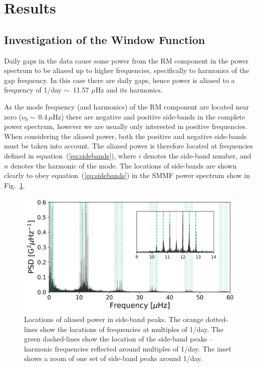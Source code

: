 \section{Results}\label{sec:SMMF_reults}

\subsection{Investigation of the Window Function}\label{sec:window_fn}


Daily gaps in the data cause some power from the RM component in the power spectrum to be aliased up to higher frequencies, specifically to harmonics of the gap frequency. In this case there are daily gaps, hence power is aliased to a frequency of 1/day $\sim$~11.57 $\mu$Hz and its harmonics.

As the mode frequency (and harmonics) of the RM component are located near zero ($\nu_0 \sim \,0.4 \, \mu\mathrm{Hz}$) there are negative and positive side-bands in the complete power spectrum, however we are usually only interested in positive frequencies. When considering the aliased power, both the positive and negative side-bands must be taken into account. The aliased power is therefore located at frequencies defined in equation~(\ref{eq:sidebands}), where $i$ denotes the side-band number, and $n$ denotes the harmonic of the mode. The locations of side-bands are shown clearly to obey equation~(\ref{eq:sidebands}) in the SMMF power spectrum show in Fig.~\ref{fig:sideband_locations}.

\begin{figure}[ht!]
	\centering
	\includegraphics[width=\columnwidth]{sideband.png}
	\caption{Locations of aliased power in side-band peaks. The orange dotted-lines show the locations of frequencies at multiples of 1/day. The green dashed-lines show the location of the side-band peaks -- harmonic frequencies reflected around multiples of 1/day.  The inset shows a zoom of one set of side-band peaks around 1/day.}
	\label{fig:sideband_locations}
\end{figure}

